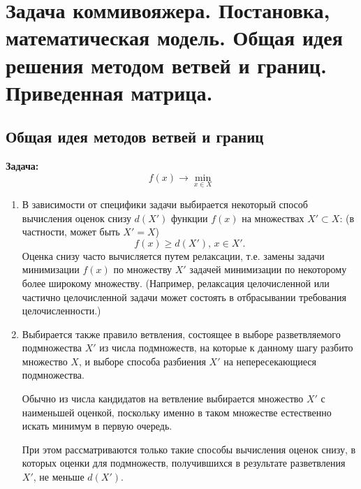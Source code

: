 \documentclass[17pt]{extarticle}
\begin{document}
\section{Задача коммивояжера. Постановка, математическая модель. Общая идея решения методом ветвей и границ. Приведенная матрица.}
\subsection{Общая идея методов ветвей и границ}
\textbf{Задача:}
\[
    f(x) \rightarrow \min_{x \in X}
\]
\begin{enumerate}
    \item В зависимости от специфики задачи выбирается некоторый способ вычисления оценок снизу \( d(X') \) функции \( f(x) \) на множествах \( X' \subset X \):
          (в частности, может быть \( X' = X \))
          \[
              f(x) \geq d(X'), \, x \in X'.
          \]
          Оценка снизу часто вычисляется путем релаксации,
          т.е. замены задачи минимизации \( f(x) \) по множеству \( X' \) задачей минимизации по некоторому более широкому множеству.
          (Например, релаксация целочисленной или частично целочисленной задачи может состоять в отбрасывании требования целочисленности.)

    \item Выбирается также правило ветвления, состоящее в выборе разветвляемого подмножества \( X' \) из числа подмножеств,
          на которые к данному шагу разбито множество \( X \), и выборе способа разбиения \( X' \) на непересекающиеся подмножества.

          Обычно из числа кандидатов на ветвление выбирается множество \( X' \) с наименьшей оценкой,
          поскольку именно в таком множестве естественно искать минимум в первую очередь.

          При этом рассматриваются только такие способы вычисления оценок снизу, в которых оценки для подмножеств,
          получившихся в результате разветвления \( X' \), не меньше \( d(X') \).
\end{enumerate}
\end{document}
